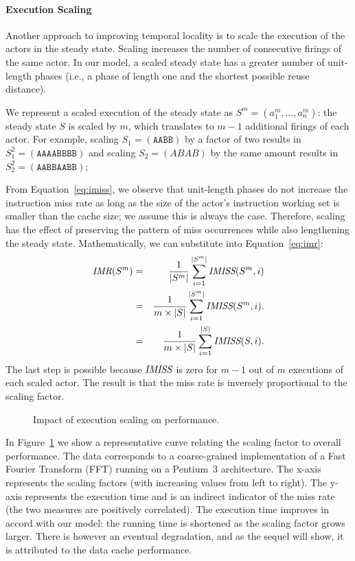 \paragraph*{Execution Scaling}
Another approach to improving temporal locality is to scale the
execution of the actors in the steady state. Scaling increases the
number of consecutive firings of the same actor. In our model, a
scaled steady state has a greater number of unit-length phases (i.e., a
phase of length one and the shortest possible reuse distance).

We represent a scaled execution of the steady state as
$S^m=(a_1^m,\dots, a_n^m)$: the steady state $S$ is scaled by $m$, which
translates to $m-1$ additional firings of 
each actor. For example, scaling $S_1=(\texttt{AABB})$ by a factor of
two results in
$S_1^2=(\texttt{AAAABBBB})$
and scaling $S_2=(ABAB)$ by the same amount results in 
$S_2^2=(\texttt{AABBAABB})$;

From Equation~\ref{eq:imiss}, we observe that unit-length phases do
not increase the instruction miss rate  as long as the size of the actor's 
instruction working set  is smaller than the cache
size; we assume this is always the case. Therefore, scaling has the
effect of preserving the pattern of 
miss occurrences while also lengthening the steady state. Mathematically,
we can substitute into Equation~\ref{eq:imr}:
\begin{eqnarray}
  \nonumber
  \mbox{\it IMR}(S^m)  &=& \frac{1}{|S^m|}\sum_{i=1}^{|S^m|} \mbox{\it IMISS}(S^m,i) \\
  \nonumber
                 &=& \frac{1}{m \times |S|}\sum_{i=1}^{|S^m|} \mbox{\it IMISS}(S^m,i). \\
  \label{eq:imrM}
                 &=& \frac{1}{m \times |S|}\sum_{i=1}^{|S|} \mbox{\it IMISS}(S,i).
\end{eqnarray}
The last step is possible because $\mbox{\it IMISS}$ is zero for $m-1$ out
of $m$ executions of each scaled actor.  The result is that the miss
rate is inversely proportional to the scaling factor.
\begin{figure}[t]
\begin{center}
  \caption{Impact of execution scaling on performance.}
 \label{fig:scaling-data}
\end{center}
\end{figure}

In Figure~\ref{fig:scaling-data} we show a
representative curve relating the scaling factor to overall
performance. The data corresponds to a coarse-grained implementation of 
a Fast Fourier Transform (FFT) running on a Pentium~3 architecture. The
x-axis represents the scaling factors (with increasing values from
left to right). The y-axis represents the execution time and is an
indirect indicator of the miss rate (the two measures are positively
correlated). The execution time improves in accord with our model: 
the running time is shortened as the scaling factor grows larger. There
is however an eventual degradation, and as the sequel will show, it is 
attributed to the data cache performance.

